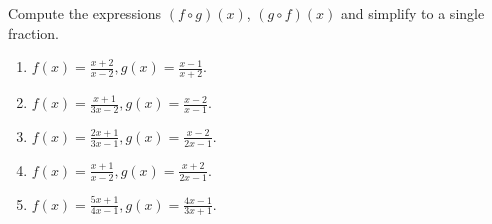 Compute the expressions $(f\circ g)(x)$, $(g\circ f)(x)$ and simplify to a single fraction. 

\begin{enumerate}
\item $f{}({{x}})=\frac{x+2}{x-2},
g{}({{x}})=\frac{x-1}{x+2}$.
\item 
$f{}({{x}})=\frac{x+1}{3x-2},
g{}({{x}})=\frac{x-2}{x-1}
$.

\item 
$f{}({{x}})=\frac{2x+1}{3x-1},
g{}({{x}})=\frac{x-2}{2x-1}
$.

\item 
$f{}({{x}})=\frac{x+1}{x-2},
g{}({{x}})=\frac{x+2}{2x-1}
$.

\item 
$f{}({{x}})=\frac{5x+1}{4x-1},
g{}({{x}})=\frac{4x-1}{3x+1}
$.


\end{enumerate}
